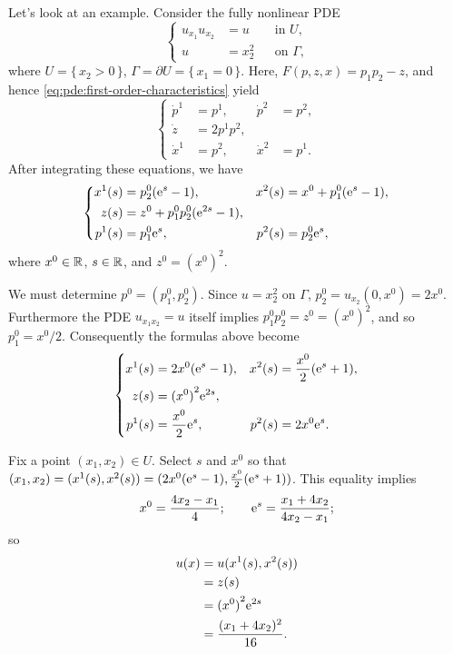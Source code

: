 \begin{example}
  Let's look at an example. Consider the fully nonlinear PDE
  \[
    \tag{\(*\)}
    \left\{
      \begin{aligned}
        u_{x_1}u_{x_2}&=u&&\text{in \(U\),}\\
        u&=x_2^2&&\text{on \(\Gamma\),}
      \end{aligned}
    \right.
  \]
  where \(U=\{\,x_2>0\,\}\), \(\Gamma=\partial U=\{\,x_1=0\,\}\). Here,
  \(F(p,z,x)=p_1p_2-z\), and hence
  \eqref{eq:pde:first-order-characteristics} yield
  \[
    \left\{
      \begin{aligned}
        \dot p^1&=p^1,&\dot p^2&=p^2,\\
        \dot z&=2p^1p^2,\\
        \dot x^1&=p^2,&\dot x^2&=p^1.
      \end{aligned}
    \right.
  \]
After integrating these equations, we have
\[
  \left\{
    \begin{aligned}
      x^1(s)&=p_2^0(\mathrm{e}^s-1),&x^2(s)&=x^0+p_1^0(\mathrm{e}^s-1),\\
      z(s)&=z^0+p_1^0p_2^0(\mathrm{e}^{2s}-1),\\
      p^1(s)&=p_1^0\mathrm{e}^s,&p^2(s)&=p_2^0\mathrm{e}^s,
    \end{aligned}
  \right.
\]
where \(x^0\in\mathbb{R}\), \(s\in\mathbb{R}\), and \(z^0={(x^0)}^2\).

We must determine \(p^0=(p_1^0,p_2^0)\). Since \(u=x_2^2\) on \(\Gamma\),
\(p_2^0=u_{x_2}(0,x^0)=2x^0\). Furthermore the PDE \(u_{x_1x_2}=u\) itself
implies \(p_1^0p_2^0=z^0={(x^0)}^2\), and so \(p_1^0=x^0/2\). Consequently
the formulas above become
\[
  \left\{
    \begin{aligned}
      x^1(s)&=2x^0(\mathrm{e}^s-1),&x^2(s)&=\frac{x^0}{2}(\mathrm{e}^s+1),\\
      z(s)&={(x^0)}^{2}\mathrm{e}^{2s},\\
      p^1(s)&=\frac{x^0}{2}\mathrm{e}^s,&p^2(s)&=2x^0\mathrm{e}^s.
    \end{aligned}
  \right.
\]

Fix a point \((x_1,x_2)\in U\). Select \(s\) and \(x^0\) so that
\((x_1,x_2)=(x^1(s),x^2(s))=(2x^0(\mathrm{e}^s-1),\frac{x^0}{2}(\mathrm{e}^s+1))\). This
equality implies
\[
  x^0=\frac{4x_2-x_1}{4};\qquad \mathrm{e}^s=\frac{x_1+4x_2}{4x_2-x_1};
\]
so
\begin{align*}
  u(x)
  &=u(x^1(s),x^2(s))\\
  &=z(s)\\
  &={(x^0)}^2\mathrm{e}^{2s}\\
  &=\frac{(x_1+4x_2)^2}{16}.
\end{align*}
\end{example}

